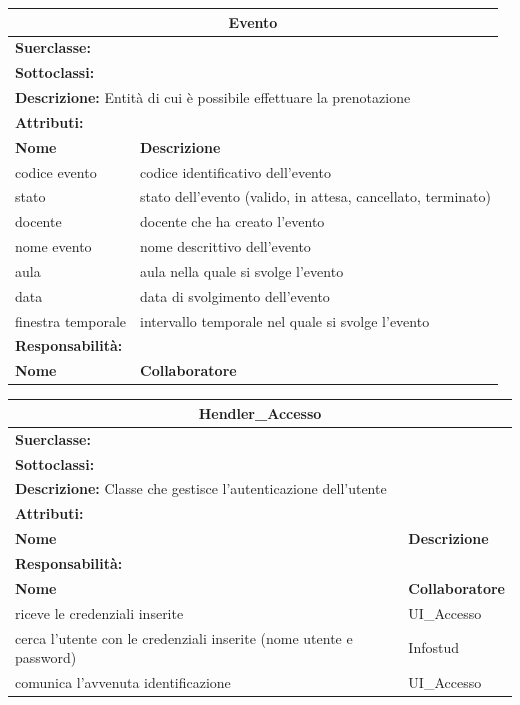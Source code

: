 \documentclass[11pt]{article}
\begin{document}
\begin{table}[H]
\centering
\begin{tabularx}{1\textwidth}{|X|X|}\hline
\multicolumn{2}{|c|}{\textbf{Evento}}\\\hline
\multicolumn{2}{|l|}{\textbf{Suerclasse:} }\\\hline
\multicolumn{2}{|l|}{\textbf{Sottoclassi:} }\\\hline
\multicolumn{2}{|l|}{\textbf{Descrizione:} Entità di cui è possibile effettuare la prenotazione}\\\hline
\multicolumn{2}{|l|}{\textbf{Attributi:}}\\
\textbf{Nome} & \textbf{Descrizione}\\
codice evento & codice identificativo dell'evento\\
stato & stato dell'evento (valido, in attesa, cancellato, terminato)\\
docente & docente che ha creato l'evento\\
nome evento & nome descrittivo dell'evento\\
aula & aula nella quale si svolge l'evento\\
data & data di svolgimento dell'evento\\
finestra temporale & intervallo temporale nel quale si svolge l'evento\\
\hline
\multicolumn{2}{|l|}{\textbf{Responsabilità:}}\\
\textbf{Nome} & \textbf{Collaboratore}\\
\hline
\end{tabularx}
\end{table}


\begin{table}[H]
\centering
\begin{tabularx}{1\textwidth}{|X|X|}\hline
\multicolumn{2}{|c|}{\textbf{Hendler\_Accesso}}\\\hline
\multicolumn{2}{|l|}{\textbf{Suerclasse:}}\\\hline
\multicolumn{2}{|l|}{\textbf{Sottoclassi:}}\\\hline
\multicolumn{2}{|l|}{\textbf{Descrizione:} Classe che gestisce l'autenticazione dell'utente}\\\hline
\multicolumn{2}{|l|}{\textbf{Attributi:}}\\
\textbf{Nome} & \textbf{Descrizione}\\
\hline
\multicolumn{2}{|l|}{\textbf{Responsabilità:}}\\
\textbf{Nome} & \textbf{Collaboratore}\\
riceve le credenziali inserite & UI\_Accesso\\
cerca l'utente con le credenziali inserite (nome utente e password) & Infostud\\
comunica l'avvenuta identificazione & UI\_Accesso\\
\hline
\end{tabularx}
\end{table}
\end{document}
